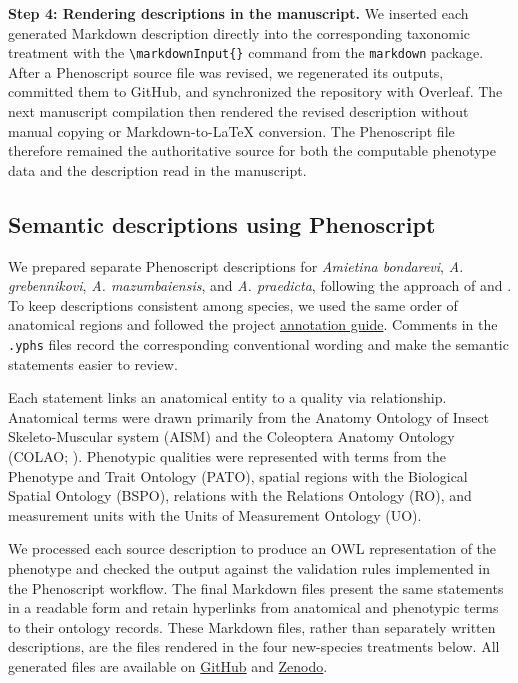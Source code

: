 \documentclass[fleqn,10pt,lineno]{wlpeerj}
\begin{document}
\textbf{Step 4: Rendering descriptions in the manuscript.}
We inserted each generated Markdown description directly into the corresponding taxonomic treatment with the \verb|\markdownInput{}| command from the \texttt{markdown} package. After a Phenoscript source file was revised, we regenerated its outputs, committed them to GitHub, and synchronized the repository with Overleaf. The next manuscript compilation then rendered the revised description without manual copying or Markdown-to-\LaTeX{} conversion. The Phenoscript file therefore remained the authoritative source for both the computable phenotype data and the description read in the manuscript.


\subsection*{Semantic descriptions using Phenoscript}

We prepared separate Phenoscript descriptions for \textit{Amietina bondarevi}, \textit{A. grebennikovi}, \textit{A. mazumbaiensis}, and \textit{A. praedicta}, following the approach of \citet{montanaro2024beyond} and \citet{montanaro2024computable}. To keep descriptions consistent among species, we used the same order of anatomical regions and followed the project \href{https://github.com/sergeitarasov/phenoscript-workshop-incol-2026/wiki/Annotation-Guide}{annotation guide}. Comments in the \texttt{.yphs} files record the corresponding conventional wording and make the semantic statements easier to review.

Each statement links an anatomical entity to a quality via relationship. Anatomical terms were drawn primarily from the Anatomy Ontology of Insect Skeleto-Muscular system (AISM) and the Coleoptera Anatomy Ontology (COLAO; \citealp{giron2024colao}). Phenotypic qualities were represented with terms from the Phenotype and Trait Ontology (PATO), spatial regions with the Biological Spatial Ontology (BSPO), relations with the Relations Ontology (RO), and measurement units with the Units of Measurement Ontology (UO). 

We processed each source description to produce an OWL representation of the phenotype and checked the output against the validation rules implemented in the Phenoscript workflow. The final Markdown files present the same statements in a readable form and retain hyperlinks from anatomical and phenotypic terms to their ontology records. These Markdown files, rather than separately written descriptions, are the files rendered in the four new-species treatments below. All generated files are available on \href{https://github.com/sergeitarasov/Amietina-Review}{GitHub} and \href{https://doi.org/10.5281/zenodo.23663901}{Zenodo}.
\end{document}
